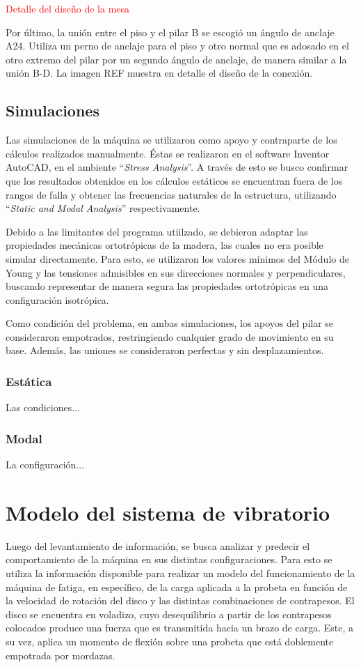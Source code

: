 \textcolor{red}{Detalle del diseño de la mesa}

Por último, la unión entre el piso y el pilar B se escogió un ángulo de anclaje A24. Utiliza un perno de anclaje para el piso y otro normal que es adosado en el otro extremo del pilar por un segundo ángulo de anclaje, de manera similar a la unión B-D. La imagen REF muestra en detalle el diseño de la conexión.
 
\subsection{Simulaciones}
Las simulaciones de la máquina se utilizaron como apoyo y contraparte de los cálculos realizados manualmente. Éstas se realizaron en el software Inventor AutoCAD, en el ambiente ``\textit{Stress Analysis}''. A través de esto se busco confirmar que los resultados obtenidos en los cálculos estáticos se encuentran fuera de los rangos de falla y obtener las frecuencias naturales de la estructura, utilizando ``\textit{Static and Modal Analysis}'' respectivamente.

Debido a las limitantes del programa utiilzado, se debieron adaptar las propiedades mecánicas ortotrópicas de la madera, las cuales no era posible simular directamente. Para esto, se utilizaron los valores mínimos del Módulo de Young y las tensiones admisibles en sus direcciones normales y perpendiculares, buscando representar de manera segura las propiedades ortotrópicas en una configuración isotrópica.

Como condición del problema, en ambas simulaciones, los apoyos del pilar se consideraron empotrados, restringiendo cualquier grado de movimiento en su base. Además, las uniones se consideraron perfectas y sin desplazamientos.
\subsubsection{Estática}
Las condiciones...
\subsubsection{Modal}
La configuración...

\section{Modelo del sistema de vibratorio}
Luego del levantamiento de información, se busca analizar y predecir el comportamiento de la máquina en sus distintas configuraciones. Para esto se utiliza la información disponible para realizar un modelo del funcionamiento de la máquina de fatiga, en específico, de la carga aplicada a la probeta en función de la velocidad de rotación del disco y las distintas combinaciones de contrapesos. El disco se encuentra en voladizo, cuyo desequilibrio a partir de los contrapesos colocados produce una fuerza que es transmitida hacia un brazo de carga. Este, a su vez, aplica un momento de flexión sobre una probeta que está doblemente empotrada por mordazas.

